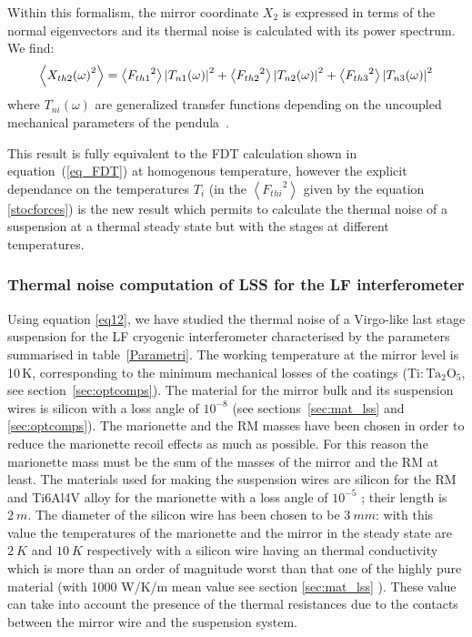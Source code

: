 Within this formalism, the mirror coordinate $X_2$ is expressed in terms of the normal eigenvectors and its thermal noise is calculated with its power spectrum. We find:  
\begin{equation}
  \left\langle {{X_{th2}}{{(\omega )}^2}} \right\rangle  = \left\langle {{F_{th1}}^2} \right\rangle {\left| {{T_{n1}}(\omega )} \right|^2} + \left\langle {{F_{th2}}^2} \right\rangle {\left| {{T_{n2}}(\omega )} \right|^2} + \left\langle {{F_{th3}}^2} \right\rangle {\left| {{T_{n3}}(\omega )} \right|^2} \\ 
\label{eq12}
\end{equation}
where $T_{ni}(\omega)$ are generalized transfer functions depending on the uncoupled mechanical parameters of the pendula~\cite{PPP2009}.

This result is fully equivalent to the FDT calculation shown in equation~(\ref{eq_FDT}) at homogenous temperature, however the explicit dependance on the temperatures $T_i$ (in the $ \left\langle {{F_{thi}}^2} \right\rangle$ given by the equation \ref{stocforces}) is the new result which permits to calculate the thermal noise of a suspension at a thermal steady state but with the stages at different temperatures.
\FloatBarrier
\subsubsection{Thermal noise computation of LSS for the LF interferometer}
Using equation \ref{eq12}, we have studied the thermal noise of a Virgo-like last stage suspension for the LF cryogenic interferometer characterised by the parameters summarised in table~\ref{Parametri}. The working temperature at the mirror level is 10\,K, corresponding to the minimum mechanical losses of the coatings ($\mathrm{Ti:Ta_2O_5}$, see section~\ref{sec:optcomps}). The material for the mirror bulk and its suspension wires is silicon with a loss angle of $10^{-8}$ (see sections~\ref{sec:mat_lss} and \ref{sec:optcomps}). 
The marionette and the RM masses have been chosen in order to reduce the marionette recoil effects as much as possible. For this reason the marionette mass must be the sum of the masses of the mirror and the RM at least. 
The materials used for making the suspension wires are silicon for the RM and Ti6Al4V alloy for the marionette with a loss angle of $10^{-5}$ \cite{tialloy}; their length is $2 \ m$. The diameter of the silicon wire has been chosen to be $3 \ mm$: with this value the temperatures of the marionette and the mirror in the steady state are $2 \ K$ and  $10 \ K$ respectively with a silicon wire having an thermal conductivity which is more than an order of magnitude worst than that one of the highly pure material (with 1000 W/K/m mean value see section \ref{sec:mat_lss} ). These value can take into account the presence of the thermal resistances due to the contacts between the mirror wire and the suspension system.

